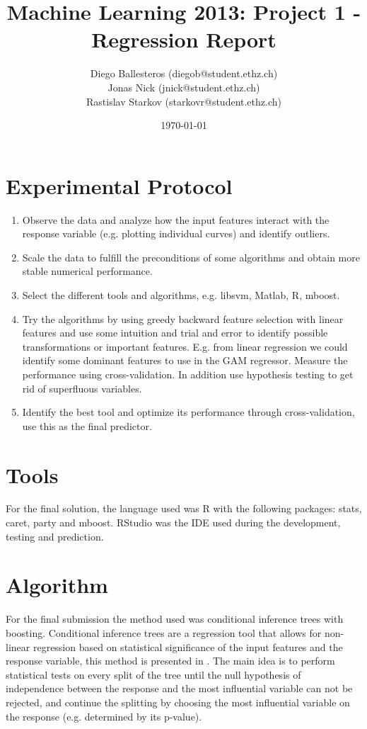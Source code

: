 \documentclass[a4paper, 11pt]{article}
\title{Machine Learning 2013: Project 1 - Regression Report}
\author{Diego Ballesteros (diegob@student.ethz.ch)\\ Jonas Nick (jnick@student.ethz.ch)\\ Rastislav Starkov (starkovr@student.ethz.ch)\\}
\date{\today}
\begin{document}
\maketitle

\section*{Experimental Protocol}

\begin{enumerate}
	\item Observe the data and analyze how the input features interact with the response variable (e.g. plotting individual curves) and identify outliers.
	\item Scale the data to fulfill the preconditions of some algorithms and obtain more stable numerical performance.
	\item Select the different tools and algorithms, e.g. libsvm, Matlab, R, mboost.
	\item Try the algorithms by using greedy backward feature selection with linear features and use some intuition and trial and error to identify possible transformations or important features. E.g. from linear regression we could identify some dominant features to use in the GAM regressor. Measure the performance using cross-validation.
In addition use hypothesis testing to get rid of superfluous variables.
    \item Identify the best tool and optimize its performance through cross-validation, use this as the final predictor.
\end{enumerate}

\section{Tools}
For the final solution, the language used was R with the following packages: stats, caret, party and mboost. RStudio was the IDE used during the development, testing and prediction.

\section{Algorithm}
For the final submission the method used was conditional inference trees with boosting. Conditional inference trees are a regression tool that allows for non-linear regression based on statistical significance of the input features and the response variable, this method is presented in \cite{Hothorn2005}. The main idea is to perform statistical tests on every split of the tree until the null hypothesis of independence between the response and the most influential variable can not be rejected, and continue the splitting by choosing the most influential variable on the response (e.g. determined by its p-value).
\end{document}
